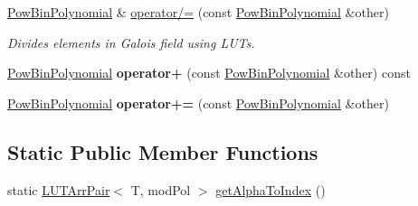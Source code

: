 \begin{DoxyCompactItemize}
\mbox{\hyperlink{class_g_flinalg_1_1_pow_bin_polynomial}{Pow\+Bin\+Polynomial}} \& \mbox{\hyperlink{class_g_flinalg_1_1_pow_bin_polynomial_a747bf5a6463be7cd89fc4320313c8563}{operator/=}} (const \mbox{\hyperlink{class_g_flinalg_1_1_pow_bin_polynomial}{Pow\+Bin\+Polynomial}} \&other)
\begin{DoxyCompactList}\small\item\em Divides elements in Galois field using L\+U\+Ts. \end{DoxyCompactList}\item 
\mbox{\label{class_g_flinalg_1_1_pow_bin_polynomial_ac265bb777534271a17f2c9f264cce2d9}} 
\mbox{\hyperlink{class_g_flinalg_1_1_pow_bin_polynomial}{Pow\+Bin\+Polynomial}} {\bfseries operator+} (const \mbox{\hyperlink{class_g_flinalg_1_1_pow_bin_polynomial}{Pow\+Bin\+Polynomial}} \&other) const
\item 
\mbox{\label{class_g_flinalg_1_1_pow_bin_polynomial_ad22f7d717c29189f86ed95a3c0514b55}} 
\mbox{\hyperlink{class_g_flinalg_1_1_pow_bin_polynomial}{Pow\+Bin\+Polynomial}} {\bfseries operator+=} (const \mbox{\hyperlink{class_g_flinalg_1_1_pow_bin_polynomial}{Pow\+Bin\+Polynomial}} \&other)
\end{DoxyCompactItemize}
\subsection*{Static Public Member Functions}
\begin{DoxyCompactItemize}
\item 
static \mbox{\hyperlink{struct_g_flinalg_1_1op_1_1_l_u_t_arr_pair}{L\+U\+T\+Arr\+Pair}}$<$ T, mod\+Pol $>$ \mbox{\hyperlink{class_g_flinalg_1_1_pow_bin_polynomial_a6ecd074ac3fe062ce972ebffeb8046a6}{get\+Alpha\+To\+Index}} ()
\end{DoxyCompactItemize}
